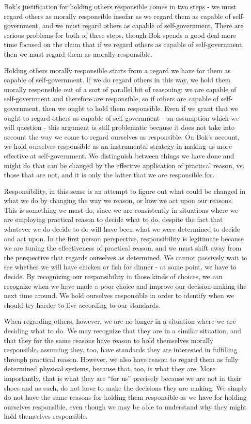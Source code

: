 \documentclass[phd,12pt,oneside,paper=letterpaper]{ubcthesis}
\begin{document}
Bok's justification for holding others responsible comes in two steps - we must regard others as morally responsible insofar as we regard them as capable of self-government, and we must regard others as capable of self-government. There are serious problems for both of these steps, though Bok spends a good deal more time focused on the claim that if we regard others as capable of self-government, then we must regard them as morally responsible. 

Holding others morally responsible starts from a regard we have for them as capable of self-government. If we do regard others in this way, we hold them morally responsible out of a sort of parallel bit of reasoning: we are capable of self-government and therefore are responsible, so if others are capable of self-government, then we ought to hold them responsible. Even if we grant that we ought to regard others as capable of self-government - an assumption which we will question - this argument is still problematic because it does not take into account the way we come to regard ourselves as responsible. On Bok's account, we hold ourselves responsible as an instrumental strategy in making us more effective at self-government. We distinguish between things we have done and might do that can be changed by the effective application of practical reason, vs. those that are not, and it is only the latter that we are responsible for.

Responsibility, in this sense is an attempt to figure out what could be changed in what we do by changing the way we reason, or how we act upon our reasons. This is something we must do, since we are consistently in situations where we are employing practical reason to decide what to do, despite the fact that whatever we do decide to do will have been what we were determined to decide and act upon. In the first person perspective, responsibility is legitimate because we are tuning the effectiveness of practical reason, and we must shift away from the perspective that regards ourselves as determined. We cannot passively wait to see whether we will have chicken or fish for dinner - at some point, we have to decide. By recognizing our responsibility in those kinds of choices, we can recognize when we have made a poor choice and improve our decision-making the next time around. We hold ourselves responsible in order to identify when we should try harder to live according to our standards. 

When regarding others, however, we are no longer in a situation where we are deciding what to do. We may recognize that they are in a similar situation, and that they for the same reasons have reason to hold themselves morally responsible, assuming they, too, have standards they are interested in fulfilling through practical reason. However, we also have reason to regard them as fully determined physical systems, because that, too, is what they are. More importantly, that is what they are ``for us'' precisely because we are not in their shoes and as such, do not have to make the decisions they are making. We simply do not have the same reasons for holding them responsible as we have for holding ourselves responsible, even though we may be able to understand why they might hold themselves responsible.
\end{document}
